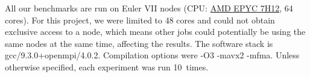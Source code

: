 All our benchmarks are run on Euler VII nodes (CPU:
\href{https://www.amd.com/fr/products/cpu/amd-epyc-7h12}{AMD EPYC 7H12}, 64 cores).
For this project, we were limited to 48 cores and could not obtain exclusive access to a node, which means other jobs could potentially be using the same nodes at the same time, affecting the results.
The software stack is gcc/9.3.0+openmpi/4.0.2.
Compilation options were -O3 -mavx2 -mfma.
Unless otherwise specified, each experiment was run 10~times.